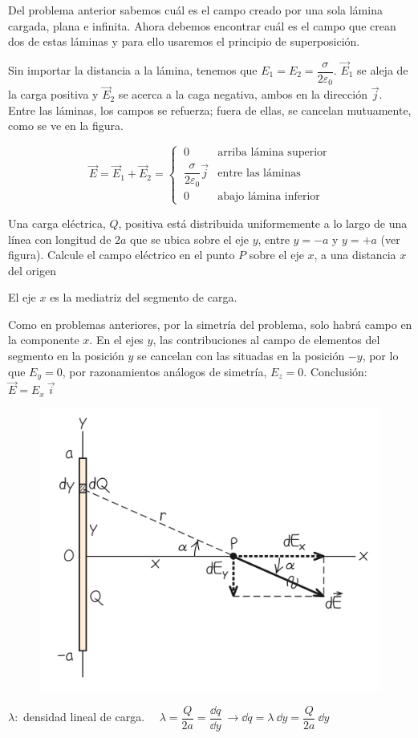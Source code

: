 Del problema anterior sabemos cuál es el campo creado por una sola lámina cargada, plana e infinita. Ahora debemos encontrar cuál es el campo que crean dos de estas láminas y para ello usaremos el principio de superposición.

Sin importar la distancia a la lámina, tenemos que $E_1=E_2=\dfrac{\sigma}{2\varepsilon_0}$. $\vec E_1$ se aleja de la carga positiva y $\vec E_2$ se acerca a la caga negativa, ambos en la dirección $\vec j$. Entre las láminas, los campos se refuerza; fuera de ellas, se cancelan mutuamente, como se ve en la figura.

$$\vec E=\vec E_1+\vec E_2=\begin{cases}
\ 0 & \text{arriba lámina superior}	 \\
\ \dfrac{\sigma}{2\varepsilon_0} \vec j & \text{entre las láminas} \\
\ 0 & \text{abajo lámina inferior}
\end{cases}$$


\begin{prob}
Una carga eléctrica, $Q$, positiva está distribuida uniformemente a lo largo de una línea con longitud de $2a$ que se ubica sobre el eje $y$, entre $y=-a$ y $y=+a$ (ver figura). Calcule el campo eléctrico en el punto $P$ sobre el eje $x$, a una distancia $x$ del origen
\end{prob}
El eje $x$ es la mediatriz del segmento de carga.
\begin{multicols}{2}
	Como en problemas anteriores, por la simetría del problema, solo habrá campo en la componente $x$. En el ejes $y$, las contribuciones al campo de elementos del segmento en la posición $y$ se cancelan con las situadas en la posición $-y$, por lo que $E_y=0$, por razonamientos análogos de simetría, $E_z=0$. Conclusión: $\vec E = E_x \ \vec i$
\begin{figure}[H]
	\centering
	\includegraphics[width=.4\textwidth]{imagenes/imagenes22/T22IM23.png}
\end{figure}
\end{multicols}
$\lambda:$ densidad lineal de carga.  $\quad \lambda=\dfrac Q{2a}=\dfrac{\dd q}{\dd y} \ \to \dd q=\lambda \ \dd y=\dfrac{Q}{2a} \ \dd y$
 
